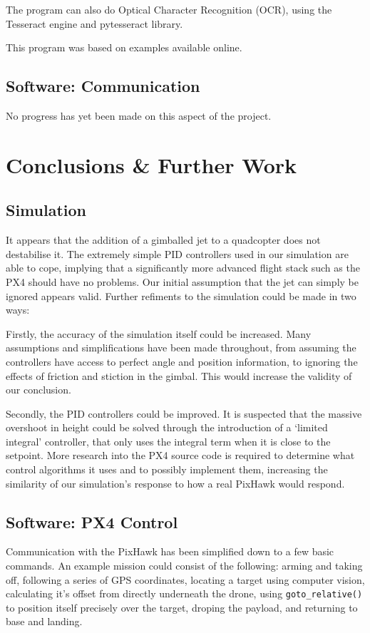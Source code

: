 \documentclass[11pt]{article}
\begin{document}
The program can also do Optical Character Recognition (OCR), using the Tesseract engine and pytesseract library.

This program was based on examples available online.\cite{opencv_tutorials}\cite{pyimagesearch_squares}\cite{pyimagesearch_ocr}

\subsection{Software: Communication}
No progress has yet been made on this aspect of the project.

\section{Conclusions \& Further Work}
\subsection{Simulation}
It appears that the addition of a gimballed jet to a quadcopter does not destabilise it. The extremely simple PID controllers used in our simulation are able to cope, implying that a significantly more advanced flight stack such as the PX4 should have no problems. Our initial assumption that the jet can simply be ignored appears valid. Further refiments to the simulation could be made in two ways:

Firstly, the accuracy of the simulation itself could be increased. Many assumptions and simplifications have been made throughout, from assuming the controllers have access to perfect angle and position information, to ignoring the effects of friction and stiction in the gimbal. This would increase the validity of our conclusion.

Secondly, the PID controllers could be improved. It is suspected that the massive overshoot in height could be solved through the introduction of a `limited integral' controller, that only uses the integral term when it is close to the setpoint. More research into the PX4 source code is required to determine what control algorithms it uses and to possibly implement them, increasing the similarity of our simulation's response to how a real PixHawk would respond.

\subsection{Software: PX4 Control}
Communication with the PixHawk has been simplified down to a few basic commands. An example mission could consist of the following: arming and taking off, following a series of GPS coordinates, locating a target using computer vision, calculating it's offset from directly underneath the drone, using \lstinline|goto_relative()| to position itself precisely over the target, droping the payload, and returning to base and landing.
\end{document}
